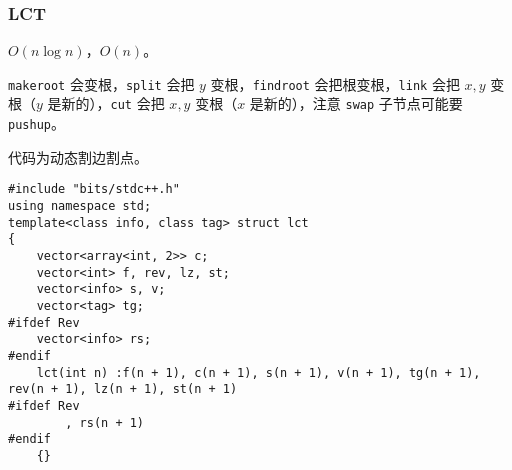 \documentclass[12pt]{ctexart}
\begin{document}
\subsubsection{LCT}

$O(n\log n)$，$O(n)$。

\verb|makeroot| 会变根，\verb|split| 会把 $y$ 变根，\verb|findroot| 会把根变根，\verb|link| 会把 $x,y$ 变根（$y$ 是新的），\verb|cut| 会把 $x,y$ 变根（$x$ 是新的），注意 \verb|swap| 子节点可能要 \verb|pushup|。

代码为动态割边割点。

\begin{lstlisting}
#include "bits/stdc++.h"
using namespace std;
template<class info, class tag> struct lct
{
	vector<array<int, 2>> c;
	vector<int> f, rev, lz, st;
	vector<info> s, v;
	vector<tag> tg;
#ifdef Rev
	vector<info> rs;
#endif
	lct(int n) :f(n + 1), c(n + 1), s(n + 1), v(n + 1), tg(n + 1), rev(n + 1), lz(n + 1), st(n + 1)
#ifdef Rev
		, rs(n + 1)
#endif
	{}


\end{lstlisting}
\end{document}
